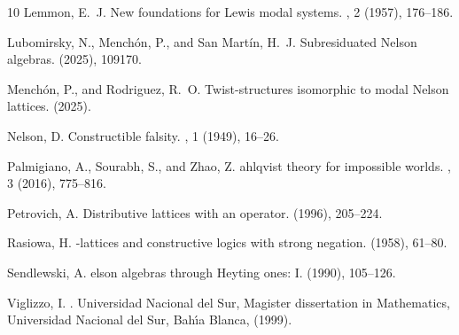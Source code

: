 \documentclass{article}
\begin{document}
\begin{thebibliography}{10}
{\sc Lemmon, E.~J.}
\newblock New foundations for {L}ewis modal systems.
, 2 (1957), 176--186.

{\sc Lubomirsky, N., Mench{\'o}n, P., and {San Martín}, H.~J.}
\newblock Subresiduated {N}elson algebras.
 (2025), 109170.

{\sc Menchón, P., and Rodriguez, R.~O.}
\newblock Twist-structures isomorphic to modal {N}elson lattices.
 (2025).

{\sc Nelson, D.}
\newblock Constructible falsity.
, 1 (1949), 16--26.

{\sc Palmigiano, A., Sourabh, S., and Zhao, Z.}
ahlqvist theory for impossible worlds.
, 3 (2016), 775--816.

{\sc Petrovich, A.}
\newblock Distributive lattices with an operator.
 (1996), 205--224.

{\sc Rasiowa, H.}
-lattices and constructive logics with strong negation.
 (1958), 61--80.

{\sc Sendlewski, A.}
elson algebras through {H}eyting ones: I.
 (1990), 105--126.

{\sc Viglizzo, I.}
.
\newblock Universidad Nacional del Sur,
\newblock Magister dissertation in Mathematics, Universidad Nacional del Sur, Bah{\'{\i}}a Blanca, (1999).

\end{thebibliography}


\end{document}
